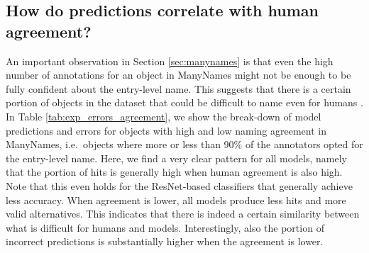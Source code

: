 \subsection{How do predictions correlate with human agreement?}

An important observation in Section \ref{sec:manynames} is that even the high number of annotations for an object in ManyNames might not be enough to be fully confident about the entry-level name.
This suggests that there is a certain portion of objects in the dataset that could be difficult to name even for humans .
In Table \ref{tab:exp_errors_agreement}, we show the break-down of model predictions and errors for objects with high and low naming agreement in ManyNames, i.e.\ objects where more or less than 90\% of the annotators opted for the entry-level name. 
Here, we find a very clear pattern for all models, namely that the portion of hits is generally high when human agreement is also high.
Note that this even holds for the ResNet-based classifiers that generally achieve less accuracy.
When agreement is lower, all models produce less hits and more valid alternatives. 
This indicates that there is indeed a certain similarity between what is difficult for humans and models.
Interestingly, also the portion of incorrect predictions is substantially higher when the agreement is lower. 













